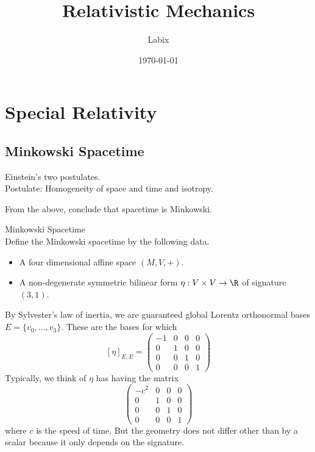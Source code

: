 \documentclass[a4paper]{article}
\title{Relativistic Mechanics}
\author{Labix}
\date{\today}
\begin{document}
\maketitle
\pagebreak
\tableofcontents

\pagebreak
\section{Special Relativity}
\subsection{Minkowski Spacetime}
Einstein's two postulates. \\
Postulate: Homogeneity of space and time and isotropy. 

From the above, conclude that spacetime is Minkowski. 

\begin{defn}{Minkowski Spacetime}{}\\
Define the Minkowski spacetime by the following data. 
\begin{itemize}
\item A four dimensional affine space $(M,V,+)$. 
\item A non-degenerate symmetric bilinear form $\eta:V\times V\to\R$ of signature $(3,1)$. 
\end{itemize}
\end{defn}

By Sylvester's law of inertia, we are guaranteed global Lorentz orthonormal bases $E=\{v_0,\dots,v_3\}$. These are the bases for which $$[\eta]_{E,E}=\begin{pmatrix}
-1 & 0 & 0 & 0\\
0 & 1 & 0 & 0\\
0 & 0 & 1 & 0\\
0 & 0 & 0 & 1
\end{pmatrix}$$ Typically, we think of $\eta$ has having the matrix $$\begin{pmatrix}
-c^2 & 0 & 0 & 0\\
0 & 1 & 0 & 0\\
0 & 0 & 1 & 0\\
0 & 0 & 0 & 1
\end{pmatrix}$$ where $c$ is the speed of time. But the geometry does not differ other than by a scalar because it only depends on the signature. \\
\end{document}
